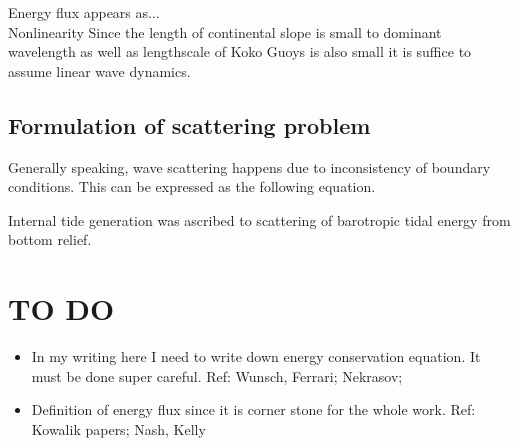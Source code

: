 Energy flux appears as...\\
Nonlinearity
Since the length of continental slope is small to dominant wavelength as well as lengthscale of Koko Guoys is also small it is suffice to assume linear wave dynamics.

\subsection{Formulation of scattering problem}
Generally speaking, wave scattering happens due to inconsistency of boundary conditions. This can be expressed as the following equation.

Internal tide generation was ascribed to scattering of barotropic tidal energy from bottom relief.

\newpage
\section{TO DO}
\begin{itemize}
\item In my writing here I need to write down energy conservation equation. It must be done super careful. Ref: Wunsch, Ferrari; Nekrasov; 
\item Definition of energy flux since it is corner stone for the whole work. Ref: Kowalik papers; Nash, Kelly

\end{itemize}




